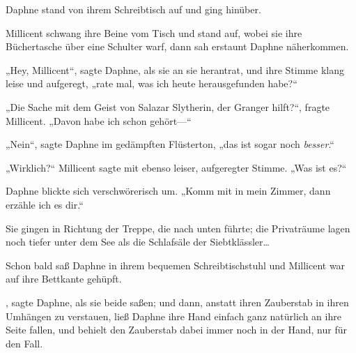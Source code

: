 Daphne stand von ihrem Schreibtisch auf und ging hinüber.

Millicent schwang ihre Beine vom Tisch und stand auf, wobei sie ihre Büchertasche über eine Schulter warf, dann sah erstaunt Daphne näherkommen.

„Hey, Millicent“, sagte Daphne, als sie an sie herantrat, und ihre Stimme klang leise und aufgeregt, „rate mal, was ich heute herausgefunden habe?“

„Die Sache mit dem Geist von Salazar Slytherin, der Granger hilft?“, fragte Millicent. „Davon habe ich schon gehört—“

„Nein“, sagte Daphne im gedämpften Flüsterton, „das ist sogar noch \emph{besser}.“

„Wirklich?“ Millicent sagte mit ebenso leiser, aufgeregter Stimme. „Was ist es?“

Daphne blickte sich verschwörerisch um. „Komm mit in mein Zimmer, dann erzähle ich es dir.“

Sie gingen in Richtung der Treppe, die nach unten führte; die Privaträume lagen noch tiefer unter dem See als die Schlafsäle der Siebtklässler…

Schon bald saß Daphne in ihrem bequemen Schreibtischstuhl und Millicent war auf ihre Bettkante gehüpft.

, sagte Daphne, als sie beide saßen; und dann, anstatt ihren Zauberstab in ihren Umhängen zu verstauen, ließ Daphne ihre Hand einfach ganz natürlich an ihre Seite fallen, und behielt den Zauberstab dabei immer noch in der Hand, nur für den Fall.

